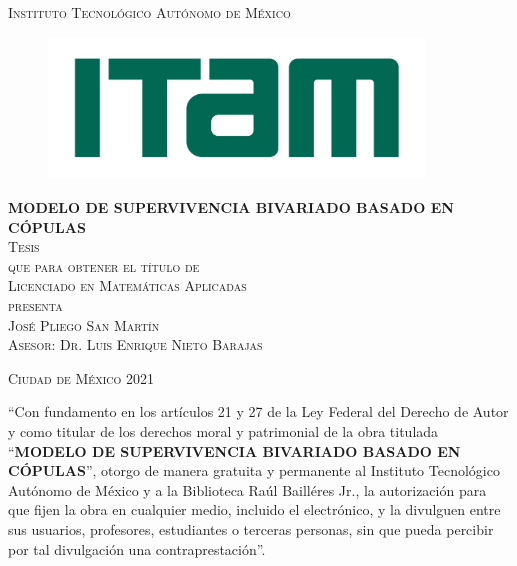\documentclass[11pt,a4paper]{article}
\begin{document}
\begin{titlepage}
\begin{center}

\textsc{\Large Instituto Tecnológico Autónomo de México}\\[4em]

\begin{figure}[h]
\begin{center}
\centering\includegraphics[width=10cm]{logo-ITAM.png}
\end{center}
\end{figure}

\vspace{4em}

\textsc{\LARGE \textbf{MODELO DE SUPERVIVENCIA BIVARIADO BASADO EN CÓPULAS}}\\[4em]

\textsc{\large Tesis}\\[1em]

\textsc{que para obtener el título de}\\[1em]

\textsc{Licenciado en Matemáticas Aplicadas}\\[1em]

\textsc{presenta}\\[1em]

\textsc{\Large José Pliego San Martín}\\[1em]

\textsc{\large Asesor: Dr. Luis Enrique Nieto Barajas}

\end{center}

\vspace*{\fill}
\textsc{Ciudad de México \hspace*{\fill} 2021}

\end{titlepage}

\thispagestyle{empty}
\vspace*{\fill}
\begingroup
``Con fundamento en los artículos 21 y 27 de la Ley Federal del Derecho de Autor y como titular de los derechos moral y patrimonial de la obra titulada ``\textbf{MODELO DE SUPERVIVENCIA BIVARIADO BASADO EN CÓPULAS}'', otorgo de manera gratuita y permanente al Instituto Tecnológico Autónomo de México y a la Biblioteca Raúl Bailléres Jr., la autorización para que fijen la obra en cualquier medio, incluido el electrónico, y la divulguen entre sus usuarios, profesores, estudiantes o terceras personas, sin que pueda percibir por tal divulgación una contraprestación''.
\end{document}
